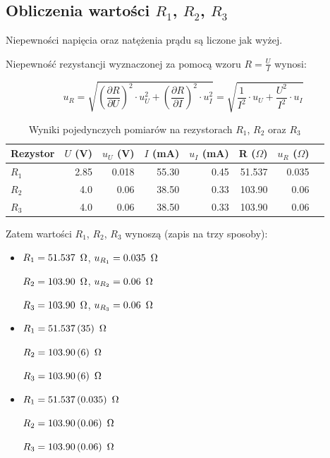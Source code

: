 \documentclass[a4paper]{article}
\newlength{\du}
\begin{document}
\subsection{Obliczenia wartości $R_1$, $R_2$, $R_3$}

Niepewności napięcia oraz natężenia prądu są liczone jak wyżej.

Niepewność rezystancji wyznaczonej za pomocą wzoru $R = \frac{U}{I}$ wynosi:

$$u_R = \sqrt{(\frac{\partial R}{\partial U})^2 \cdot u_U^2 + (\frac{\partial R}{\partial I})^2 \cdot u_I^2} = \sqrt{\frac{1}{I^2} \cdot u_U + \frac{U^2}{I^2} \cdot u_I}$$

\begin{table}[h]
\centering
\begin{tabular}{lrrrrrrl}
\toprule
Rezystor &  $U$ (V) &  $u_U$ (V) &  $I$ (mA) &  $u_I$ (mA) &  R ($\Omega$) &  $u_R$ ($\Omega$) \\
\midrule
$R_1$ &          2.85 &           0.018 &                  55.30 &              0.45 &             51.537 &             0.035 \\
$R_2$ &          4.0 &           0.06 &                  38.50 &              0.33 &            103.90 &             0.06 \\
$R_3$ &          4.0 &           0.06 &                  38.50 &              0.33 &            103.90 &             0.06 \\
\bottomrule
\end{tabular}
\caption{Wyniki pojedynczych pomiarów na rezystorach $R_1$, $R_2$ oraz $R_3$}
\end{table}

\newpage
Zatem wartości $R_1$, $R_2$, $R_3$ wynoszą (zapis na trzy sposoby):

\begin{itemize}
\item $R_1 = 51.537 \enskip \Omega$, $u_{R_1} = 0.035 \enskip \Omega$

$R_2 = 103.90 \enskip \Omega$, $u_{R_2} = 0.06 \enskip \Omega$

$R_3 = 103.90 \enskip \Omega$, $u_{R_3} = 0.06 \enskip \Omega$

\item $R_1 = 51.537 \, (35) \enskip \Omega$

$R_2 = 103.90 \, (6) \enskip \Omega$

$R_3 = 103.90 \, (6) \enskip \Omega$

\item $R_1 = 51.537 \, (0.035) \enskip \Omega$

$R_2 = 103.90 \, (0.06) \enskip \Omega$

$R_3 = 103.90 \, (0.06) \enskip \Omega$
\end{itemize}
\end{document}
